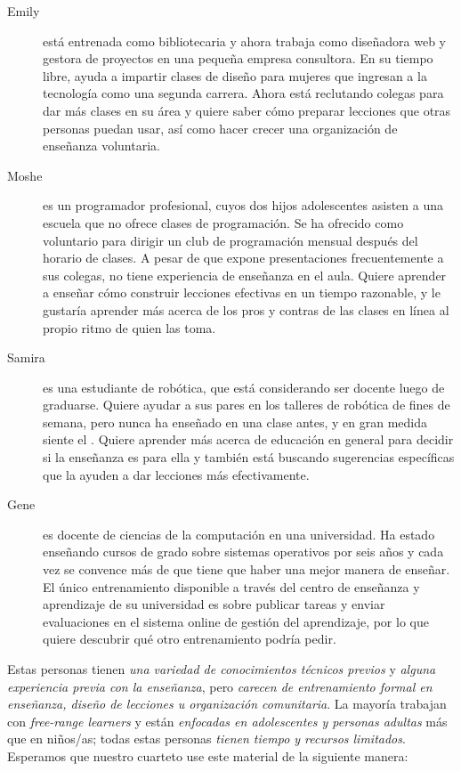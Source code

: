 \begin{description}

\item[Emily]
está entrenada como bibliotecaria
y ahora trabaja como diseñadora web y gestora de proyectos en una pequeña empresa consultora.
En su tiempo libre, ayuda a impartir clases de diseño para mujeres que ingresan a la tecnología como una segunda carrera.
Ahora está reclutando colegas para dar más clases en su área
y quiere saber cómo preparar lecciones que otras personas puedan usar,
así como hacer crecer una organización de enseñanza voluntaria.

\item[Moshe]
es un programador profesional, cuyos dos hijos adolescentes
asisten a una escuela que no ofrece clases de programación.
Se ha ofrecido como voluntario para dirigir un club de programación mensual después del horario de clases.
A pesar de que expone presentaciones frecuentemente a sus colegas,
no tiene experiencia de enseñanza en el aula.
Quiere aprender a enseñar cómo construir lecciones efectivas en un tiempo razonable,
y le gustaría aprender más acerca de los pros y contras de las clases en línea al propio ritmo de quien las toma.

\item[Samira]
es una estudiante de robótica, que está considerando ser docente luego de graduarse.
Quiere ayudar a sus pares en los talleres de robótica de fines de semana,
pero nunca ha enseñado en una clase antes,
y en gran medida siente el .
Quiere aprender más acerca de educación en general para decidir si la enseñanza es para ella
y también está buscando sugerencias específicas que la ayuden a dar lecciones más efectivamente. 

\item[Gene]
es docente de ciencias de la computación en una universidad.
Ha estado enseñando cursos de grado sobre sistemas operativos por seis años
y cada vez se convence más de que tiene que haber una mejor manera de enseñar.
El único entrenamiento disponible a través del centro de enseñanza y aprendizaje de su universidad 
es sobre publicar tareas y enviar evaluaciones en el sistema online de gestión del aprendizaje,
por lo que quiere descubrir qué otro entrenamiento podría pedir.

\end{description}
Estas personas tienen \emph{una variedad de conocimientos técnicos previos}
y \emph{alguna experiencia previa con la enseñanza},
pero \emph{carecen de entrenamiento formal en enseñanza, diseño de lecciones u organización comunitaria}.
La mayoría trabajan con \emph{free-range learners}
y están \emph{enfocadas en adolescentes y personas adultas}
más que en niños/as;
todas estas personas \emph{tienen tiempo y recursos limitados}.
Esperamos que nuestro cuarteto use este material de la siguiente manera:

